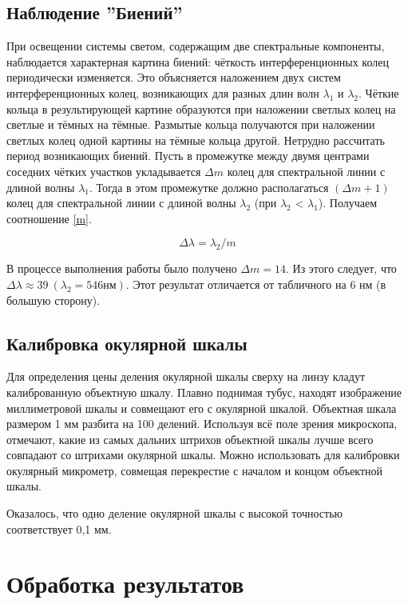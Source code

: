 \documentclass[a4paper,12pt]{article} %
\begin{document}
\subsection{Наблюдение ''Биений''}

При освещении системы светом, содержащим две спектральные компоненты, наблюдается характерная картина биений: чёткость интерференционных колец периодически изменяется. Это объясняется наложением двух систем интерференционных колец, возникающих для разных длин волн $\lambda_1$ и $\lambda_2$. Чёткие кольца в результирующей картине образуются при наложении светлых колец на светлые и тёмных на тёмные. Размытые кольца получаются при наложении светлых колец одной картины на тёмные кольца другой.
Нетрудно рассчитать период возникающих биений. Пусть в промежутке между двумя центрами соседних чётких участков укладывается $\Delta m$ колец для спектральной линии с длиной волны $\lambda_1$. Тогда в этом промежутке должно располагаться $(\Delta m + 1)$ колец для спектральной линии с длиной волны $\lambda_2$ (при $\lambda_2$ < $\lambda_1$).
Получаем соотношение \eqref{m}.

\begin{equation}
    \Delta \lambda = \lambda_2 / m
    \label{m}
\end{equation}

В процессе выполнения работы было получено $\Delta m = 14$. Из этого следует, что $\displaystyle \Delta \lambda \approx 39 \ (\lambda_2 = 546 \text{нм})$. Этот результат отличается от табличного на 6 нм (в большую сторону).

\subsection{Калибровка окулярной шкалы}

Для определения цены деления окулярной шкалы сверху на линзу кладут калиброванную объектную шкалу. Плавно поднимая тубус, находят изображение миллиметровой шкалы и совмещают его с окулярной шкалой.
Объектная шкала размером 1 мм разбита на 100 делений. Используя всё поле зрения микроскопа, отмечают, какие из самых дальних штрихов объектной шкалы лучше всего совпадают со штрихами окулярной шкалы. Можно использовать для калибровки окулярный микрометр, совмещая перекрестие с началом и концом объектной шкалы.

Оказалось, что одно деление окулярной шкалы с высокой точностью соответствует 0,1 мм.

\section{Обработка результатов}
\end{document}
